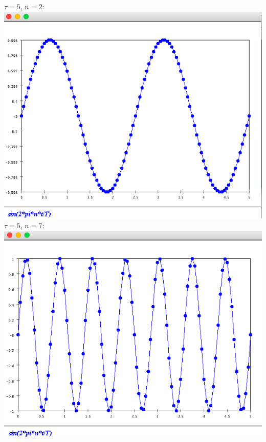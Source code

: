 \documentclass{article}
\begin{document}
\begin{enumerate}
$\tau=5$, $n=2$:\\
\includegraphics[scale=0.5]{exercise3_2}\\

$\tau=5$, $n=7$:\\
\includegraphics[scale=0.5]{exercise3_2_n-7}


\end{enumerate}
\end{document}
